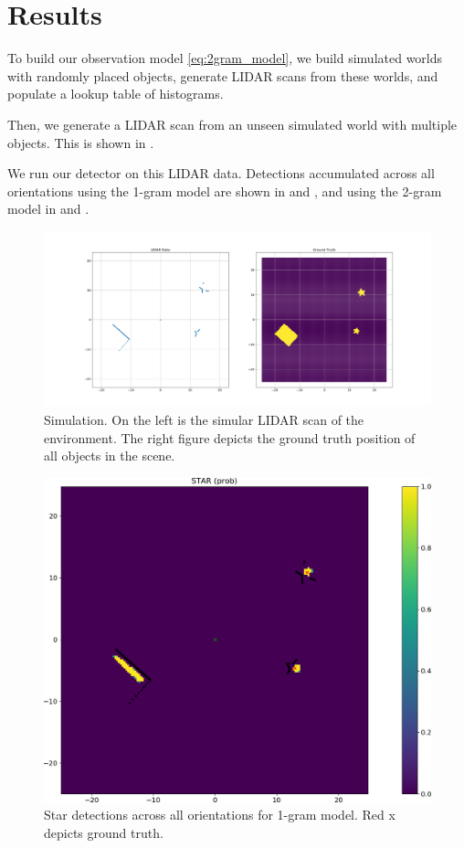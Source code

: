 \section{Results}

To build our observation model \eqref{eq:2gram_model}, we build simulated
worlds with randomly placed objects, generate LIDAR scans from these worlds, and
populate a lookup table of histograms.

Then, we generate a LIDAR scan from an unseen simulated world with multiple
objects. This is shown in .

We run our detector on this LIDAR data. Detections accumulated across all
orientations using the 1-gram model are shown in  and
, and using the 2-gram model in 
and .
%
\begin{figure}
  \centering
  \includegraphics[width=\columnwidth]{figures/ground_truth.png}
  \caption{Simulation. On the left is the simular LIDAR scan of the environment.
    The right figure depicts the ground truth position of all objects in the
    scene.}
  \label{fig:sim_world}
\end{figure}
%
\begin{figure}
  \centering
  \includegraphics[width=\columnwidth]{figures/star_1gram.png}
  \caption{Star detections across all orientations for 1-gram model. Red x
    depicts ground truth.}
  \label{fig:star_1gram}
\end{figure}
